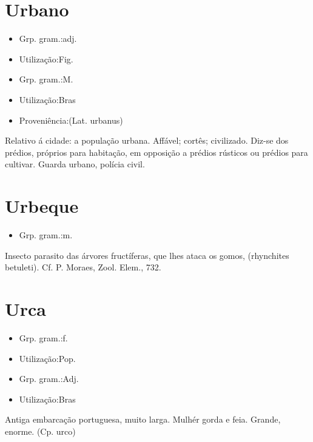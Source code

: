 \documentclass{article}
\begin{document}
\section{Urbano}
\begin{itemize}
\item {Grp. gram.:adj.}
\end{itemize}
\begin{itemize}
\item {Utilização:Fig.}
\end{itemize}
\begin{itemize}
\item {Grp. gram.:M.}
\end{itemize}
\begin{itemize}
\item {Utilização:Bras}
\end{itemize}
\begin{itemize}
\item {Proveniência:(Lat. \textunderscore urbanus\textunderscore )}
\end{itemize}
Relativo á cidade: \textunderscore a população urbana\textunderscore .
Affável; cortês; civilizado.
Diz-se dos prédios, próprios para habitação, em opposição a prédios rústicos ou prédios para cultivar.
Guarda urbano, polícia civil.
\section{Urbeque}
\begin{itemize}
\item {Grp. gram.:m.}
\end{itemize}
Insecto parasito das árvores fructíferas, que lhes ataca os gomos, (\textunderscore rhynchites betuleti\textunderscore ). Cf. P. Moraes, \textunderscore Zool. Elem.\textunderscore , 732.
\section{Urca}
\begin{itemize}
\item {Grp. gram.:f.}
\end{itemize}
\begin{itemize}
\item {Utilização:Pop.}
\end{itemize}
\begin{itemize}
\item {Grp. gram.:Adj.}
\end{itemize}
\begin{itemize}
\item {Utilização:Bras}
\end{itemize}
Antiga embarcação portuguesa, muito larga.
Mulhér gorda e feia.
Grande, enorme.
(Cp. \textunderscore urco\textunderscore )
\end{document}
